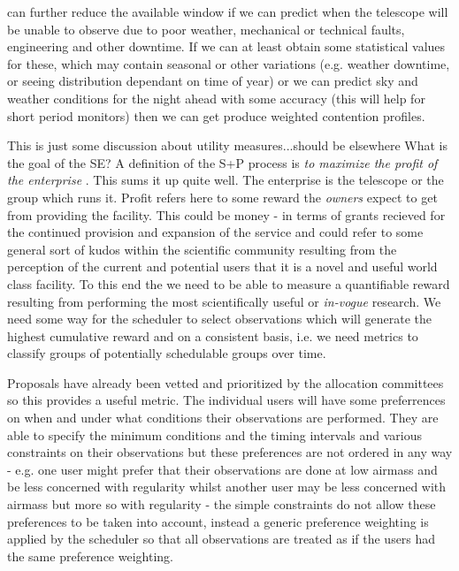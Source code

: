 can further reduce the available window if we can predict when the telescope will be unable to observe due to poor weather, mechanical or technical faults, engineering and other downtime. If we can at least obtain some statistical values for these, which may contain seasonal or other variations (e.g. weather downtime, or seeing distribution dependant on time of year) or we can predict sky and weather conditions for the night ahead with some accuracy (this will help for short period monitors) then we can get produce weighted contention profiles.


\begin{note}This is just some discussion about utility measures...should be elsewhere
What is the goal of the SE? A definition of the S+P process is \emph{to maximize the profit of the enterprise} \cite{miyashita96distributed}. This sums it up quite well. The enterprise is the telescope or the group which runs it. Profit refers here to some reward the \emph{owners} expect to get from providing the facility. This could be money - in terms of grants recieved for the continued provision and expansion of the service and could refer to some general sort of kudos within the scientific community resulting from the perception of the current and potential users that it is a novel and useful world class facility. To this end the we need to be able to measure a quantifiable reward resulting from performing the most scientifically useful or \emph{in-vogue} research. We need some way for the scheduler to select observations which will generate the highest cumulative reward and on a consistent basis, i.e. we need metrics to classify groups of potentially schedulable groups over time. 

Proposals have already been vetted and prioritized by the allocation committees so this provides a useful metric. The individual users will have some preferrences on when and under what conditions their observations are performed. They are able to specify the minimum conditions and the timing intervals and various constraints on their observations but these preferences are not ordered in any way - e.g. one user might prefer that their observations are done at low airmass and be less concerned with regularity whilst another user may be less concerned with airmass but more so with regularity - the simple constraints do not allow these preferences to be taken into account, instead a generic preference weighting is applied by the scheduler so that all observations are treated as if the users had the same preference weighting. 


\end{note}
